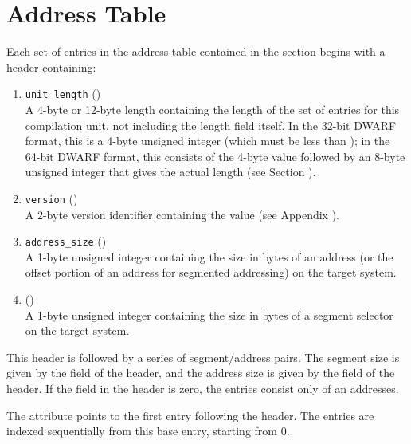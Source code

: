 \section{Address Table}
\label{chap:addresstable}
Each set of entries in the address table contained in the
\dotdebugaddr{} section begins with a header containing:
\begin{enumerate}[1. ]
\item \texttt{unit\_length} () \\
A 4-byte or 12-byte length containing the length of
the set of entries for this compilation unit, not
including the length field itself. In the 32-bit
DWARF format, this is a 4-byte unsigned integer
(which must be less than \xfffffffzero); in the 64-bit
DWARF format, this consists of the 4-byte value
\wffffffff followed by an 8-byte unsigned integer
that gives the actual length (see 
Section ).

\item  \texttt{version} (\HFTuhalf) \\
A 2-byte version identifier containing the value
\versiondotdebugaddr{} 
(see Appendix ).

\item	\texttt{address\_size} (\HFTubyte) \\
A 1-byte unsigned integer containing the size in
bytes of an address (or the offset portion of an
address for segmented addressing) on the target
system.

\item	\HFNsegmentselectorsize{} (\HFTubyte) \\
A 1-byte unsigned integer containing the size in
bytes of a segment selector on the target system.
\end{enumerate}

This header is followed by a series of segment/address pairs.
The segment size is given by the \HFNsegmentselectorsize{} field of the
header, and the address size is given by the 
field of the header. If the \HFNsegmentselectorsize{} field in the header
is zero, the entries consist only of an addresses.

The \DWATaddrbase{} attribute points to the first entry
following the header. The entries are indexed sequentially
from this base entry, starting from 0.

